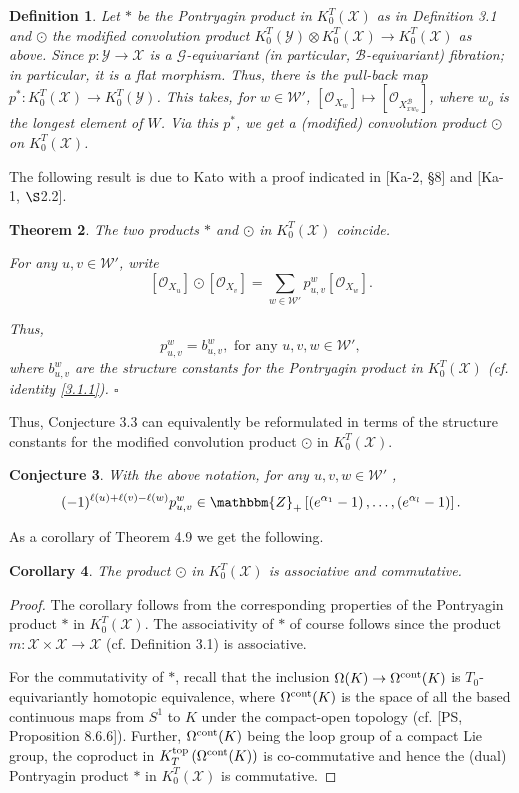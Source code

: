 \documentclass{article}
\newtheorem{theorem}{Theorem}[section]
\newtheorem{definition}[theorem]{Definition}
\newtheorem{conjecture}[theorem]{Conjecture}
\newtheorem{corollary}[theorem]{Corollary}
\def\G{\mathcal{G}}
\def\X{\mathcal{X}}
\def\B{\mathcal{B}}
\def\W{\mathcal{W}}
\def\mathbb{\mathbbm}
\def\Y{\mathcal{Y}}
\def\ref#1{#1}
\def\top{\rm{top}}
\def\cont{\rm{cont}}
\begin{document}
\begin{definition}
{Let $*$ be the Pontryagin product in $K_0^T(\X)$ as in Definition 3.1 and $\odot$ the modified convolution product $K_0^T(\Y)\otimes K_0^T(\X)\rightarrow K_0^T(\X)$ as above. Since $p:\Y \rightarrow \X$ is a $\G$-equivariant (in particular, $\B$-equivariant) fibration; in particular, it is a flat morphism. Thus, there is the pull-back map $p^*:K_0^T(\X) \rightarrow K_0^T(\Y)$. This takes, for $w\in \W'$, $[\mathcal{O}_{X_w}]\mapsto[\mathcal{O}_{X^\B_{xw_o}}]$, where $w_o$ is the longest element of $W$. Via this $p^*$, we get a (modified) convolution product $\odot$ on $K_0^T(\X)$. }
\end{definition}


The following result is due to Kato with  a proof indicated  in [Ka-2, \S8] and [Ka-1, $\S$2.2]. 
\begin{theorem}\label{4.9}
 The two products $*$ and $\odot$ in $K_0^T(\X)$ coincide.  

For any $u,v\in \W'$, write 
\begin{equation}\label{4.9.1}
\left[\mathcal{O}_{X_u}\right] \odot \left[\mathcal{O}_{X_v}\right] = \sum_{w\in \W'} p_{u,v}^w \left[ \mathcal{O}_{X_w}\right].
\end{equation}

Thus,
$$
p_{u,v}^w = b^w_{u,v}, \mbox{ for any } u,v,w\in \W',
$$
where $b_{u,v}^w$ are the structure constants for the Pontryagin product in $K_0^T(\X)$ (cf. identity \eqref{3.1.1}). $\square$
\end{theorem}

Thus, Conjecture 3.3 can equivalently be reformulated in terms of the structure constants for the modified convolution product $\odot$ in $K_0^T(\X)$. 
\begin{conjecture}\label{4.10}
With the above notation, for any $u,v,w\in \W'$ ,
$$
(-1)^{\ell(u)+\ell(v)-\ell(w)}p_{u,v}^w \in \mathbb{Z}_+ \left[\left (e^{\alpha_{1}}-1\right),\ldots , \left (e^{\alpha_{l}}-1\right)\right].
$$
\end{conjecture}
As a corollary of Theorem \ref{4.9} we get the following. 


\begin{corollary}\label{4.11}
The product $\odot$ in $K_0^T(\X)$ is associative and commutative. 
\end{corollary}

\begin{proof}
The corollary follows from the corresponding properties of the Pontryagin product $*$ in $K_0^T(\X)$. The associativity of $*$ of course follows since the product $m:\X \times \X \rightarrow \X$ (cf. Definition 3.1) is associative. 

For the commutativity of $*$, recall that the inclusion $\Omega(K)\rightarrow \Omega ^{\cont}(K)$ is $T_0$-equivariantly homotopic equivalence, where $\Omega ^{\cont}(K)$ is the space of all the based continuous maps from $S^1$ to $K$ under the compact-open topology (cf. [PS, Proposition 8.6.6]). Further, $ \Omega ^{\cont}(K)$ being the loop group of a compact Lie group, the coproduct in $K_T^{\top}\left( \Omega ^{\cont}(K)\right)$ is co-commutative and hence the (dual) Pontryagin product $*$ in $K_0^T(\X)$ is commutative. 
\end{proof} 
\end{document}
